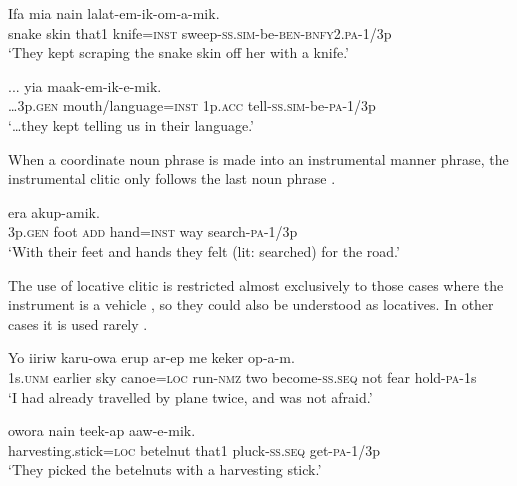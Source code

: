 \ea%
\label{ex:4:x886}
\gll Ifa  mia  nain    lalat-em-ik-om-a-mik. \\
  snake  skin  that1  knife=\textsc{inst}  sweep-\textsc{ss}.\textsc{sim}-be-\textsc{ben}-\textsc{bnfy}2.\textsc{pa}-1/3p    \\
\glt`They kept scraping the snake skin off her with a knife.'
\z

\ea%
\label{ex:4:x889}
\gll ...   yia  maak-em-ik-e-mik. \\
 {\dots}3p.\textsc{gen}  mouth/language=\textsc{inst}  1p.\textsc{acc}  tell-\textsc{ss}.\textsc{sim}-be-\textsc{pa}-1/3p     \\
\glt`{\dots}they kept telling us in their language.'
\z

When a coordinate noun phrase is made into an instrumental manner phrase, the instrumental clitic only follows the last noun phrase .

\ea%
\label{ex:4:x892}
\gll {}    era akup-amik. \\
   3p.\textsc{gen} foot \textsc{add} hand=\textsc{inst} way search-\textsc{pa}-1/3p   \\
\glt`With their feet and hands they felt (lit: searched) for the road.'
\z

The use of locative clitic is restricted almost exclusively to those cases where the instrument is a vehicle , so they could also be understood as locatives. In other cases it is used rarely .

\ea%
\label{ex:4:x887}
\gll Yo  iiriw     karu-owa  erup  ar-ep me  keker  op-a-m. \\
 1s.\textsc{unm}  earlier  sky  canoe=\textsc{loc}  run-\textsc{nmz}  two  become-\textsc{ss}.\textsc{seq}  not  fear  hold-\textsc{pa}-1s   \\
\glt`I had already travelled by plane twice, and was not afraid.'
\z

\ea%
\label{ex:4:x888}
\gll {}  owora  nain  teek-ap  aaw-e-mik. \\
  harvesting.stick=\textsc{loc}  betelnut  that1  pluck-\textsc{ss}.\textsc{seq}  get-\textsc{pa}-1/3p    \\
\glt`They picked the betelnuts with a harvesting stick.'
\z

